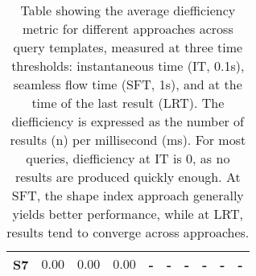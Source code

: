 \begin{table}[h]
{\begin{tabular}{|c|c|c|c||c|c|c||c|c|c|}
        \hline
        S7 & $\boldsymbol{0.00}$ & $\boldsymbol{0.00}$ & $\boldsymbol{0.00}$ & - & - & - & - & - & - \\
        \hline
    \end{tabular}
    }
    \caption{Table showing the average diefficiency metric for different approaches across query templates, measured at three time thresholds: instantaneous time (IT, 0.1s), seamless flow time (SFT, 1s), and at the time of the last result (LRT).
    The diefficiency is expressed as the number of results (n) per millisecond (ms).
    For most queries, diefficiency at IT is 0, as no results are produced quickly enough.
    At SFT, the shape index approach generally yields better performance, while at LRT, results tend to converge across approaches.}
	\label{tab:dief}
\end{table}
    